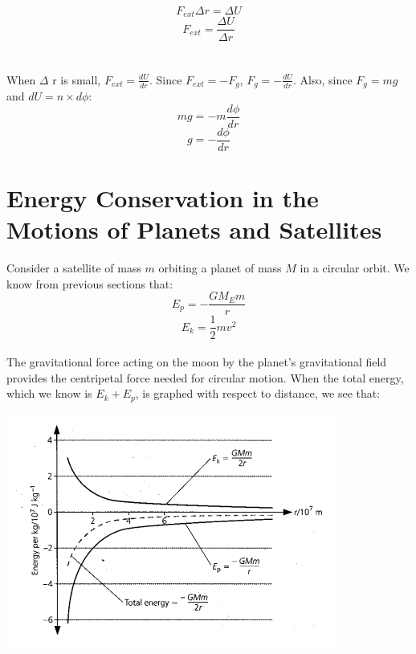 \documentclass{article}
\begin{document}
\begin{equation}
    F_{ext}\Delta r=\Delta U
\end{equation}  
\begin{equation}
    F_{ext}=\frac{\Delta U}{\Delta r}
\end{equation}\leavevmode
\pagebreak
\\
\\When $\Delta$ r is small, $F_{ext}=\frac{dU}{dr}$. Since $F_{ext}=-F_g$, $F_g=-\frac{dU}{dr}$.
Also, since $F_g=mg$ and $dU=n\times d\phi$:
\begin{equation}
    mg=-m\frac{d\phi}{dr}
\end{equation}
\begin{equation}
    g=-\frac{d\phi}{dr}
\end{equation}
\section{Energy Conservation in the Motions of Planets and Satellites}
Consider a satellite of mass $m$ orbiting a planet of mass $M$ in a circular orbit. We know from previous sections that:
\begin{equation}
    E_p=-\frac{GM_E m}{r}
\end{equation}
\begin{equation}
    E_k=\frac{1}{2}mv^2
\end{equation}
\\
The gravitational force acting on the moon by the planet's gravitational field provides the centripetal force needed for circular motion.
When the total energy, which we know is $E_k+E_p$, is graphed with respect to distance, we see that:
\begin{center}
    \includegraphics[scale=0.6]{assets/teGraph.png}
\end{center}\leavevmode
\end{document}
